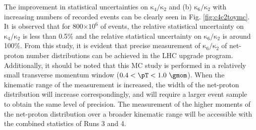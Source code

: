 The improvement in statistical uncertainties on $\mathrm{\kappa}_{4}/\mathrm{\kappa}_{2}$ and (b) $\mathrm{\kappa}_{6}/\mathrm{\kappa}_{2}$ with increasing numbers of recorded events can be clearly seen in Fig. \ref{fig:c4c2toymc}. It is observed that for 800$\times 10^{6}$ of events, the relative statistical uncertainty on $\mathrm{\kappa}_{4}/\mathrm {\kappa}_{2}$ is less than 0.5\% and the relative statistical uncertainty on $\mathrm{\kappa}_{6}/\mathrm{\kappa}_{2}$ is around 100\%. From this study, it is evident that precise measurement of $\mathrm{\kappa}_{6}/\mathrm {\kappa}_{2}$ of net-proton number distributions can be achieved in the LHC upgrade program. Additionally, it should be noted that this MC study is performed in a relatively small  transverse momentum window ($0.4 < \pT < 1.0~\gmom$). When the kinematic range of the measurement is increased, the width of the net-proton distribution will increase correspondingly, and will require a larger event sample to obtain the same level of precision.  The measurement of the higher moments of the net-proton distribution over a broader kinematic range will be accessible with the combined statistics of Runs 3 and 4.


